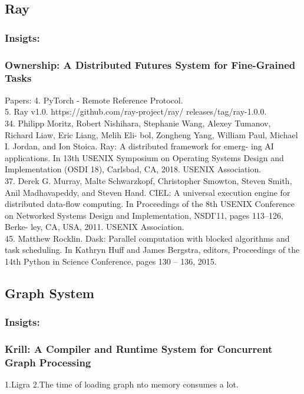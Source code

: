 \documentclass[UTF8]{article}
\begin{document}
\subsection{Ray}
\subsubsection{Insigts:}
\subsubsection{Ownership: A Distributed Futures System for Fine-Grained Tasks~\cite{wang2021ownership}}

Papers:
4. PyTorch - Remote Reference Protocol. \\
5. Ray v1.0. https://github.com/ray-project/ray/ releases/tag/ray-1.0.0.\\
34. Philipp Moritz, Robert Nishihara, Stephanie Wang, Alexey Tumanov, Richard Liaw, Eric Liang, Melih Eli- bol, Zongheng Yang, William Paul, Michael I. Jordan, and Ion Stoica. Ray: A distributed framework for emerg- ing AI applications. In 13th USENIX Symposium on Operating Systems Design and Implementation (OSDI 18), Carlsbad, CA, 2018. USENIX Association.\\
37. Derek G. Murray, Malte Schwarzkopf, Christopher Smowton, Steven Smith, Anil Madhavapeddy, and Steven Hand. CIEL: A universal execution engine for distributed data-flow computing. In Proceedings of the 8th USENIX Conference on Networked Systems Design and Implementation, NSDI’11, pages 113–126, Berke- ley, CA, USA, 2011. USENIX Association.\\
45. Matthew Rocklin. Dask: Parallel computation with blocked algorithms and task scheduling. In Kathryn Huff and James Bergstra, editors, Proceedings of the 14th Python in Science Conference, pages 130 – 136, 2015.\\

\subsection{Graph System}
\subsubsection{Insigts:}
\subsubsection{Krill: A Compiler and Runtime System for Concurrent Graph Processing}
1.Ligra 
2.The time of loading graph nto memory consumes a lot. 
\end{document}
